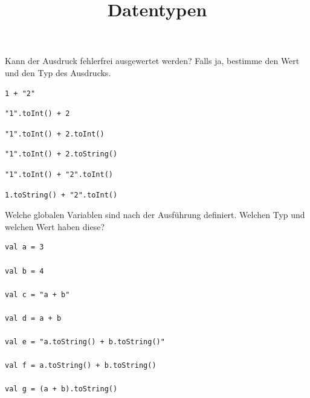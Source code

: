 \documentclass[DIV = 11]{scrartcl}
\title{Datentypen}
\begin{document}
\begin{aufgabe}
Kann der Ausdruck fehlerfrei ausgewertet werden? Falls ja, bestimme den  Wert und den Typ des Ausdrucks.\\
\begin{teilaufgaben}

\teilaufgabe
\begin{verbatim}
1 + "2"
\end{verbatim}

\teilaufgabe
\begin{verbatim}
"1".toInt() + 2
\end{verbatim}

\teilaufgabe
\begin{verbatim}
"1".toInt() + 2.toInt()
\end{verbatim}

\teilaufgabe
\begin{verbatim}
"1".toInt() + 2.toString()
\end{verbatim}

\teilaufgabe
\begin{verbatim}
"1".toInt() + "2".toInt()
\end{verbatim}

\teilaufgabe
\begin{verbatim}
1.toString() + "2".toInt()
\end{verbatim}
\end{teilaufgaben}
\end{aufgabe}

\begin{aufgabe}
Welche globalen Variablen sind nach der Ausführung definiert. Welchen Typ und welchen Wert haben diese?


\begin{verbatim}
val a = 3

val b = 4

val c = "a + b"

val d = a + b

val e = "a.toString() + b.toString()"

val f = a.toString() + b.toString()

val g = (a + b).toString()
\end{verbatim}

\end{aufgabe}
\end{document}
